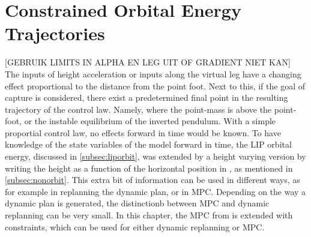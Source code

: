 %
\chapter{Constrained Orbital Energy Trajectories}\label{chap:mpc}
[GEBRUIK LIMITS IN ALPHA EN LEG UIT OF GRADIENT NIET KAN] The inputs of height acceleration or inputs along the virtual leg have a changing effect proportional to the distance from the point foot. Next to this, if the goal of capture is considered, there exist a predetermined final point in the resulting trajectory of the control law. Namely, where the point-mass is above the point-foot, or the instable equilibrium of the inverted pendulum. With a simple proportial control law, no effects forward in time would be known. To have knowledge of the state variables of the model forward in time, the \ac{LIP} orbital energy, discussed in \ref{subsec:liporbit}, was extended by a height varying version by writing the height as a function of the horizontal position in  \cite{pratt2007derivation}, as mentioned in \ref{subsec:nonorbit}. This extra bit of information can be used in different ways, as for example in replanning the dynamic plan, or in \ac{MPC}. Depending on the way a dynamic plan is generated, the distinctionb between \ac{MPC} and dynamic replanning can be very small. In this chapter, the \ac{MPC} from \cite{koolen2016balance} is extended with constraints, which can be used for either dynamic replanning or \ac{MPC}.

